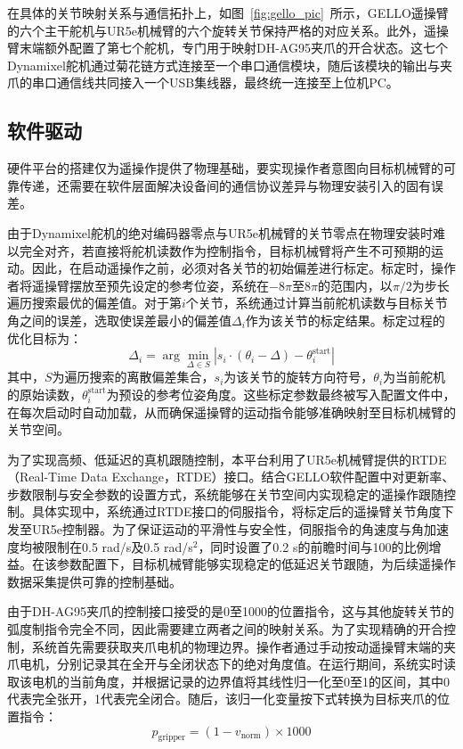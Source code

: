 在具体的关节映射关系与通信拓扑上，如图~\ref{fig:gello_pic}~所示，GELLO遥操臂的六个主干舵机与UR5e机械臂的六个旋转关节保持严格的对应关系。此外，遥操臂末端额外配置了第七个舵机，专门用于映射DH-AG95夹爪的开合状态。这七个Dynamixel舵机通过菊花链方式连接至一个串口通信模块，随后该模块的输出与夹爪的串口通信线共同接入一个USB集线器，最终统一连接至上位机PC。



\subsection{软件驱动}
\label{subsec:data_platform_software_driver}

硬件平台的搭建仅为遥操作提供了物理基础，要实现操作者意图向目标机械臂的可靠传递，还需要在软件层面解决设备间的通信协议差异与物理安装引入的固有误差。

由于Dynamixel舵机的绝对编码器零点与UR5e机械臂的关节零点在物理安装时难以完全对齐，若直接将舵机读数作为控制指令，目标机械臂将产生不可预期的运动。因此，在启动遥操作之前，必须对各关节的初始偏差进行标定。标定时，操作者将遥操臂摆放至预先设定的参考位姿，系统在$-8\pi$至$8\pi$的范围内，以$\pi/2$为步长遍历搜索最优的偏差值。对于第$i$个关节，系统通过计算当前舵机读数与目标关节角之间的误差，选取使误差最小的偏差值$\Delta_i$作为该关节的标定结果。标定过程的优化目标为：
\begin{equation}
  \label{eq:offset_calibration}
  \Delta_i = \arg\min_{\Delta \in S} \left| s_i \cdot (\theta_i - \Delta) - \theta_{i}^{\text{start}} \right|
\end{equation}
其中，$S$为遍历搜索的离散偏差集合，$s_i$为该关节的旋转方向符号，$\theta_i$为当前舵机的原始读数，$\theta_{i}^{\text{start}}$为预设的参考位姿角度。这些标定参数最终被写入配置文件中，在每次启动时自动加载，从而确保遥操臂的运动指令能够准确映射至目标机械臂的关节空间。

为了实现高频、低延迟的真机跟随控制，本平台利用了UR5e机械臂提供的RTDE（Real-Time Data Exchange，RTDE）接口。结合GELLO软件配置中对更新率、步数限制与安全参数的设置方式，系统能够在关节空间内实现稳定的遥操作跟随控制。具体实现中，系统通过RTDE接口的伺服指令，将标定后的遥操臂关节角度下发至UR5e控制器。为了保证运动的平滑性与安全性，伺服指令的角速度与角加速度均被限制在0.5 rad/s及0.5 rad/s$^2$，同时设置了0.2 s的前瞻时间与100的比例增益。在该参数配置下，目标机械臂能够实现稳定的低延迟关节跟随，为后续遥操作数据采集提供可靠的控制基础。

由于DH-AG95夹爪的控制接口接受的是0至1000的位置指令，这与其他旋转关节的弧度制指令完全不同，因此需要建立两者之间的映射关系。为了实现精确的开合控制，系统首先需要获取夹爪电机的物理边界。操作者通过手动按动遥操臂末端的夹爪电机，分别记录其在全开与全闭状态下的绝对角度值。在运行期间，系统实时读取该电机的当前角度，并根据记录的边界值将其线性归一化至0至1的区间，其中0代表完全张开，1代表完全闭合。随后，该归一化变量按下式转换为目标夹爪的位置指令：
\begin{equation}
  \label{eq:gripper_mapping}
  p_{\text{gripper}} = (1 - v_{\text{norm}}) \times 1000
\end{equation}

